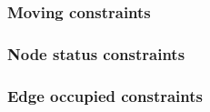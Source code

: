 \subsubsection{Moving constraints}
\subsubsection{Node status constraints}
\subsubsection{Edge occupied constraints}
